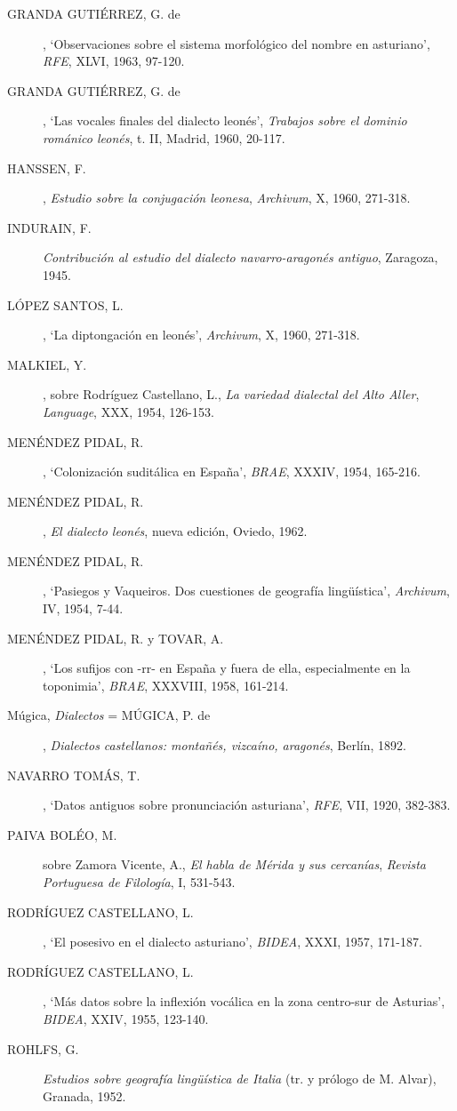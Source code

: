 \begin{description}
\item[GRANDA GUTIÉRREZ, G. de], `Observaciones sobre el sistema morfológico del nombre en asturiano', \textit{RFE}, XLVI, 1963, 97-120. 
\item[GRANDA GUTIÉRREZ, G. de], `Las vocales finales del dialecto leonés', \textit{Trabajos sobre el dominio románico leonés}, t. II, Madrid, 1960, 20-117.
\item[HANSSEN, F.], \textit{Estudio sobre  la conjugación leonesa}, \textit{Archivum}, X, 1960, 271-318.
\item[INDURAIN, F.] \textit{Contribución al estudio del dialecto navarro-aragonés antiguo}, Zaragoza, 1945.
\item[LÓPEZ SANTOS, L.], `La diptongación en leonés', \textit{Archivum}, X, 1960, 271-318.
\item[MALKIEL, Y.], sobre Rodríguez Castellano, L., \textit{La variedad dialectal del Alto Aller}, \textit{Language}, XXX, 1954, 126-153.
\item[MENÉNDEZ PIDAL, R.], `Colonización suditálica en España', \textit{BRAE}, XXXIV, 1954, 165-216.
\item[MENÉNDEZ PIDAL, R.], \textit{El dialecto leonés}, nueva edición, Oviedo, 1962.
\item[MENÉNDEZ PIDAL, R.], `Pasiegos y Vaqueiros. Dos cuestiones de geografía lingüística', \textit{Archivum}, IV, 1954, 7-44.
\item[MENÉNDEZ PIDAL, R. y TOVAR, A.],  `Los sufijos con -rr- en España y fuera de ella, especialmente en la toponimia', \textit{BRAE}, XXXVIII, 1958, 161-214. 
\item[Múgica, \textit{Dialectos} = MÚGICA, P. de], \textit{Dialectos castellanos: montañés, vizcaíno, aragonés}, Berlín, 1892.
\item[NAVARRO TOMÁS, T.], `Datos antiguos sobre pronunciación asturiana', \textit{RFE}, VII, 1920, 382-383.
\item[PAIVA BOLÉO, M.] sobre Zamora Vicente, A., \textit{El habla de Mérida y sus cercanías},  \textit{Revista Portuguesa de Filología}, I, 531-543. 
\item[RODRÍGUEZ CASTELLANO, L.], `El posesivo en el dialecto asturiano', \textit{BIDEA}, XXXI, 1957, 171-187.
\item[RODRÍGUEZ CASTELLANO, L.], `Más datos sobre la inflexión vocálica en la zona centro-sur de Asturias', \textit{BIDEA}, XXIV, 1955, 123-140.
\item[ROHLFS, G.] \textit{Estudios sobre geografía lingüística de Italia} (tr. y prólogo de M. Alvar), Granada, 1952.

\end{description}
